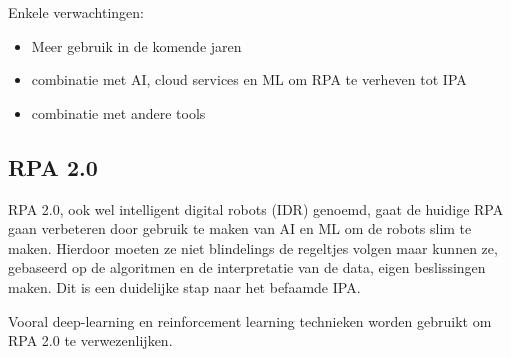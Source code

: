 Enkele verwachtingen:
\begin{itemize}
	\item Meer gebruik in de komende jaren
	\item combinatie met AI, cloud services en ML om RPA te verheven tot IPA
	\item combinatie met andere tools
\end{itemize}

\subsection{RPA 2.0}
RPA 2.0, ook wel intelligent digital robots (IDR) genoemd, gaat de huidige RPA gaan verbeteren door gebruik te maken van AI en ML om de robots slim te maken. Hierdoor moeten ze niet blindelings de regeltjes volgen maar kunnen ze, gebaseerd op de algoritmen en de interpretatie van de data, eigen beslissingen maken. Dit is een duidelijke stap naar het befaamde IPA. \autocite{idrRPA}

Vooral deep-learning en reinforcement learning technieken worden gebruikt om RPA 2.0 te verwezenlijken. \autocite{idrRPA}